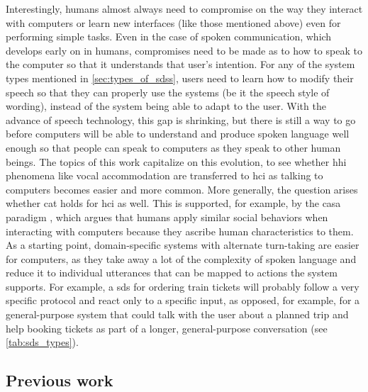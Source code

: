 Interestingly, humans almost always need to compromise on the way they interact with computers or learn new interfaces (like those mentioned above) even for performing simple tasks.
Even in the case of spoken communication, which develops early on in humans, compromises need to be made as to how to speak to the computer so that it understands that user's intention.
For any of the system types mentioned in \cref{sec:types_of_sdss}, users need to learn how to modify their speech so that they can properly use the systems (be it the speech style of wording), instead of the system being able to adapt to the user.
With the advance of speech technology, this gap is shrinking, but there is still a way to go before computers will be able to understand and produce spoken language well enough so that people can speak to computers as they speak to other human beings.
The topics of this work capitalize on this evolution, to see whether \ac{hhi} phenomena like vocal accommodation are transferred to \ac{hci} as talking to computers becomes easier and more common.
More generally, the question arises whether \ac{cat} holds for \ac{hci} as well.
This is supported, for example, by the \ac{casa} paradigm \citep{Nass1994computers, Nass2000machines},
which argues that humans apply similar social behaviors when interacting with computers because they ascribe human characteristics to them.
As a starting point, domain-specific systems with alternate turn-taking are easier for computers, as they take away a lot of the complexity of spoken language and reduce it to individual utterances that can be mapped to actions the system supports.
For example, a \ac{sds} for ordering train tickets will probably follow a very specific protocol and react only to a specific input, as opposed, for example, for a general-purpose system that could talk with the user about a planned trip and help booking tickets as part of a longer, general-purpose conversation (see \cref{tab:sds_types}).

\subsection{Previous work}
\label{subsec:previous_work}


